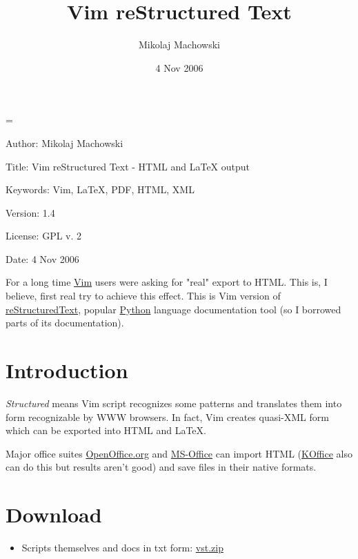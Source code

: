 \documentclass[12pt]{article}
\author{Mikolaj Machowski}
\date{4 Nov 2006}
\newenvironment{deflist}[1]{%
\begin{list}{}
{\renewcommand{\makelabel}[1]{\textbf{##1}\hfill}
\settowidth{\labelwidth}{\textbf{#1}}
\leftmargin=\labelwidth
\advance \leftmargin\labelsep}}
{\end{list}}
\begin{document}
\title{Vim reStructured Text}
\maketitle
\begin{deflist}{Keywords:}

\item[Author:] Mikolaj Machowski

\item[Title:] Vim reStructured Text - HTML and \LaTeX{} output

\item[Keywords:] Vim, \LaTeX{}, PDF, HTML, XML

\item[Version:] 1.4

\item[License:] GPL v. 2

\item[Date:] 4 Nov 2006
\end{deflist}

For a long time \href{http://www.vim.org}{Vim} users were asking for "real" export to HTML. This is,
I believe, first real try to achieve this effect. This is Vim version of
\href{http://docutils.sf.net}{reStructuredText}, popular \href{http://www.python.org}{Python} language documentation tool (so I borrowed
parts of its documentation).

\tableofcontents
\hypertarget{lintroduction}{}
\section{Introduction}

\emph{Structured} means Vim script recognizes some patterns and translates them
into form recognizable by WWW browsers. In fact, Vim creates quasi-XML
form which can be exported into HTML and \LaTeX{}.

Major office suites \href{http://www.openoffice.org}{OpenOffice.org} and \href{http://www.microsoft.com}{MS-Office} can import HTML
(\href{http://koffice.kde.org}{KOffice} also can do this but results aren't good) and save files in
their native formats.

\hypertarget{ldownload}{}
\section{Download}
\begin{itemize}
\item
Scripts themselves and docs in txt form: \href{http://skawina.eu.org/mikolaj/vst.zip}{vst.zip}
\end{itemize}
\end{document}
